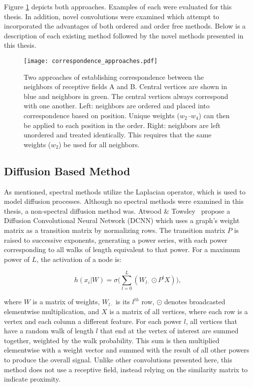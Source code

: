 Figure \ref{fig:correspondence_approaches} depicts both approaches.
Examples of each were evaluated for this thesis.
In addition, novel convolutions were examined which attempt to incorporated the advantages of both ordered and order free methods.
Below is a description of each existing method followed by the novel methods presented in this thesis. 

\begin{figure}
	\centering
	\texttt{[image: correspondence\_approaches.pdf]}
	\caption{Two approaches of establishing correspondence between the neighbors of receptive fields A and B. Central vertices are shown in blue and neighbors in green. The central vertices always correspond with one another. Left: neighbors are ordered and placed into correspondence based on position. Unique weights (\textit{$w_2$--$w_4$}) can then be applied to each position in the order. Right: neighbors are left unordered and treated identically. This requires that the same weights (\textit{$w_2$}) be used for all neighbors.}
	\label{fig:correspondence_approaches}
\end{figure}


\subsection{Diffusion Based Method}
As mentioned, spectral methods utilize the Laplacian operator, which is used to model diffusion processes. 
Although no spectral methods were examined in this thesis, a non-spectral diffusion method was.
Atwood \& Towsley~\cite{atwood2016} propose a Diffusion Convolutional Neural Network (DCNN) which uses a graph's weight matrix as a transition matrix by normalizing rows.
The transition matrix $P$ is raised to successive exponents, generating a power series, with each power corresponding to all walks of length equivalent to that power.
For a maximum power of $L$, the activation of a node is:

\begin{equation}
h(x_i | W) = \sigma \bigg( \sum_{l=0}^L (W_{l\cdot} \odot P^l X ) \bigg),
\label{eq:diffusion}
\end{equation}

\noindent
where $W$ is a matrix of weights, $W_{l\cdot}$ is its $l^{th}$ row, $\odot$ denotes broadcasted elementwise multiplication, and $X$ is a matrix of all vertices, where each row is a vertex and each column a different feature.
For each power $l$, all vertices that have a random walk of length $l$ that end at the vertex of interest are summed together, weighted by the walk probability.
This sum is then multiplied elementwise with a weight vector and summed with the result of all other powers to produce the overall signal.
Unlike other convolutions presented here, this method does not use a receptive field, instead relying on the similarity matrix to indicate proximity.


